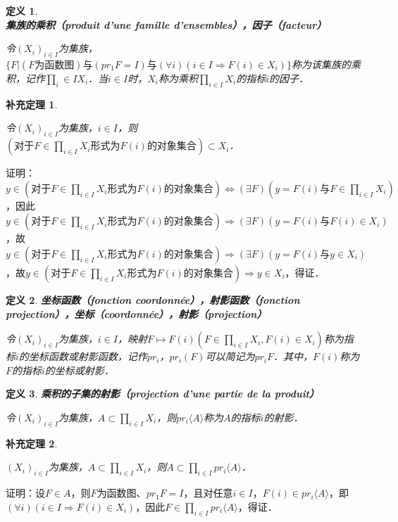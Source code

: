 \documentclass[12pt, a4paper, oneside]{book}
\newtheorem{cor}{补充定理}
\newtheorem{de}{定义}
\begin{document}
			\begin{de}
				\textbf{集族的乘积（produit d'une famille d'ensembles），因子（facteur）}
				\par
				令$(X_i)_{i\in I}$为集族，$\{F|(F\text{为函数图})\text{与}(pr_1F= I)\text{与}(\forall i)(i\in I\Rightarrow F(i)\in X_i)\}$称为该集族的乘积，记作$\prod\limits_i\in IX_i$．当$i\in I$时，$X_i$称为乘积$\prod\limits_{i\in I}X_i$的指标$i$的因子．			
			\end{de}
			
			\begin{cor}\label{cor125}
				\hfill\par
				令$(X_i)_{i\in I}$为集族，$i\in I$，则$(\text{对于}F\in \prod\limits_{i\in I}X_i\text{形式为}F(i)\text{的对象集合})\subset X_i$．
			\end{cor}
			证明：$y\in (\text{对于}F\in \prod\limits_{i\in I}X_i\text{形式为}F(i)\text{的对象集合})\Leftrightarrow (\exists F)(y=F(i)\text{与}F\in \prod\limits_{i\in I}X_i)$，因此$y\in (\text{对于}F\in \prod\limits_{i\in I}X_i\text{形式为}F(i)\text{的对象集合})\Rightarrow (\exists F)(y=F(i)\text{与}F(i)\in X_i)$，故$y\in (\text{对于}F\in \prod\limits_{i\in I}X_i\text{形式为}F(i)\text{的对象集合})\Rightarrow (\exists F)(y=F(i)\text{与}y\in X_i)$，故$y\in (\text{对于}F\in \prod\limits_{i\in I}X_i\text{形式为}F(i)\text{的对象集合})\Rightarrow y\in X_i$，得证．

			\begin{de}
				\textbf{坐标函数（fonction coordonnée），射影函数（fonction projection），坐标（coordonnée），射影（projection）}
				\par
				令$(X_i)_{i\in I}$为集族，$i\in I$，映射$F\mapsto F(i)(F\in \prod\limits_{i\in I}X_i, F(i)\in X_i)$称为指标$i$的坐标函数或射影函数，记作$pr_i$，$pr_i(F)$可以简记为$pr_iF$．其中，$F(i)$称为$F$的指标$i$的坐标或射影．
			\end{de}

			\begin{de}
				\textbf{乘积的子集的射影（projection d'une partie de la produit）}
				\par
				令$(X_i)_{i\in I}$为集族，$A\subset \prod\limits_{i\in I}X_i$，则$pr_i\langle A \rangle $称为$A$的指标$i$的射影．
			\end{de}
						
			\begin{cor}\label{cor126}
				\hfill\par
				$(X_i)_{i\in I}$为集族，$A\subset \prod\limits_{i\in I}X_i$，则$A\subset \prod\limits_{i\in I}pr_i\langle A \rangle $．
			\end{cor}
			证明：设$F\in A$，则$F$为函数图、$pr_1F= I$，且对任意$i\in I$，$F(i)\in pr_i\langle A \rangle $，即$(\forall i)(i\in I\Rightarrow F(i)\in X_i)$，因此$F\in \prod\limits_{i\in I}pr_i\langle A \rangle $，得证．
\end{document}

